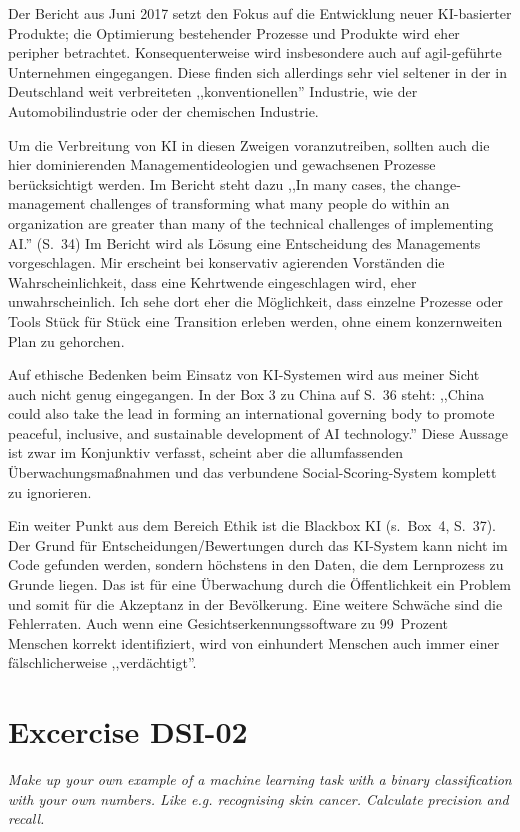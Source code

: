 \documentclass[11pt,a4paper]{article}
\begin{document}
Der Bericht aus Juni 2017 setzt den Fokus auf die Entwicklung neuer KI-basierter Produkte; die Optimierung bestehender Prozesse und Produkte wird eher peripher betrachtet. Konsequenterweise wird insbesondere auch auf agil-geführte Unternehmen eingegangen. Diese finden sich allerdings sehr viel seltener in der in Deutschland weit verbreiteten ,,konventionellen'' Industrie, wie der Automobilindustrie oder der chemischen Industrie.

Um die Verbreitung von KI in diesen Zweigen voranzutreiben, sollten auch die hier dominierenden Managementideologien und gewachsenen Prozesse berücksichtigt werden. Im Bericht steht dazu ,,In many cases, the change-management challenges of transforming what many people do within an organization are greater than many of the technical challenges of implementing AI.'' (S.~34) Im Bericht wird als Lösung eine Entscheidung des Managements vorgeschlagen. Mir erscheint bei konservativ agierenden Vorständen die Wahrscheinlichkeit, dass eine Kehrtwende eingeschlagen wird, eher unwahrscheinlich. Ich sehe dort eher die Möglichkeit, dass einzelne Prozesse oder Tools Stück für Stück eine Transition erleben werden, ohne einem konzernweiten Plan zu gehorchen.

Auf ethische Bedenken beim Einsatz von KI-Systemen wird aus meiner Sicht auch nicht genug eingegangen. In der Box 3 zu China auf S.~36 steht: ,,China could also take the lead in forming an international governing body to promote peaceful, inclusive, and sustainable development of AI technology.'' Diese Aussage ist zwar im Konjunktiv verfasst, scheint aber die allumfassenden Überwachungsmaßnahmen und das verbundene Social-Scoring-System komplett zu ignorieren.

Ein weiter Punkt aus dem Bereich Ethik ist die Blackbox KI (s.~Box~4, S.~37). Der Grund für Entscheidungen/Bewertungen durch das KI-System kann nicht im Code gefunden werden, sondern höchstens in den Daten, die dem Lernprozess zu Grunde liegen. Das ist für eine Überwachung durch die Öffentlichkeit ein Problem und somit für die Akzeptanz in der Bevölkerung. Eine weitere Schwäche sind die Fehlerraten. Auch wenn eine Gesichtserkennungssoftware zu 99~Prozent Menschen korrekt identifiziert, wird von einhundert Menschen auch immer einer fälschlicherweise ,,verdächtigt''.


\section{Excercise DSI-02}
\textit{Make up your own example of a machine learning task with a binary classification
with your own numbers. Like e.g. recognising skin cancer. Calculate precision and recall.}
\end{document}
